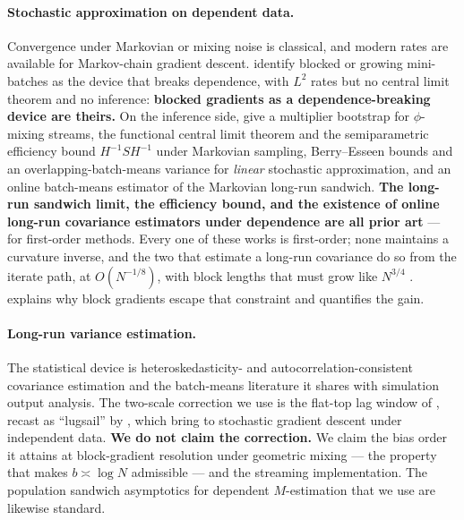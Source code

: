 \paragraph{Stochastic approximation on dependent data.}
Convergence under Markovian or mixing noise is classical, and modern rates are available for
Markov-chain gradient descent. \citet{godichonbaggioni2023learning} identify blocked or growing
mini-batches as the device that breaks dependence, with $L^2$ rates but no central limit theorem and
no inference: \textbf{blocked gradients as a dependence-breaking device are theirs.} On the inference
side, \citet{liu2023mixing} give a multiplier bootstrap for $\phi$-mixing streams,
\citet{li2023markovian} the functional central limit theorem and the semiparametric efficiency bound
$H^{-1}SH^{-1}$ under Markovian sampling, \citet{samsonov2025statistical} Berry--Esseen bounds and an
overlapping-batch-means variance for \emph{linear} stochastic approximation, and
\citet{roy2023online} an online batch-means estimator of the Markovian long-run sandwich.
\textbf{The long-run sandwich limit, the efficiency bound, and the existence of online long-run
covariance estimators under dependence are all prior art} --- for first-order methods. Every one of
these works is first-order; none maintains a curvature inverse, and the two that estimate a long-run
covariance do so from the iterate path, at $O(N^{-1/8})$, with block lengths that must grow like
$N^{3/4}$ \citep[Prop.~2, Cor.~2]{samsonov2025statistical}.  explains why block
gradients escape that constraint and  quantifies the gain.

\paragraph{Long-run variance estimation.}
The statistical device is heteroskedasticity- and autocorrelation-consistent covariance estimation and the
batch-means literature it shares with simulation output analysis. The two-scale correction we use is the
flat-top lag window of \citet{politis1995bias}, recast as ``lugsail'' by \citet{vats2022lugsail}, which
\citet[Eqs.~(15) and (17)]{singh2025utility} bring to stochastic gradient descent under independent data.
\textbf{We do not claim the correction.} We claim the bias order it attains at block-gradient resolution
under geometric mixing --- the property that makes $b\asymp\log N$ admissible --- and the streaming
implementation. The population sandwich asymptotics for dependent $M$-estimation that we use are likewise
standard.
